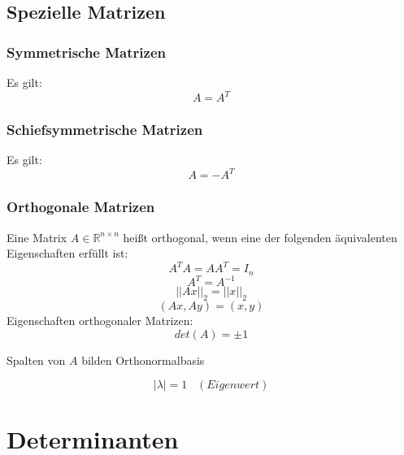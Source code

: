 \documentclass[a4paper,twocolumn,10pt]{article}
\begin{document}
\subsection{Spezielle Matrizen}

\subsubsection{Symmetrische Matrizen}
Es gilt:
\begin{equation*}
A=A^T
\end{equation*}

\subsubsection{Schiefsymmetrische Matrizen}
Es gilt:
\begin{equation*}
A=-A^T
\end{equation*}

\subsubsection{Orthogonale Matrizen}
Eine Matrix $A\in\mathbb{R}^{n\times n}$ heißt orthogonal, wenn eine der folgenden äquivalenten Eigenschaften erfüllt ist:
\begin{equation*}
A^TA=AA^T=I_n
\end{equation*}
\begin{equation*}
A^T=A^{-1}
\end{equation*}
\begin{equation*}
||Ax||_2 = ||x||_2
\end{equation*}
\begin{equation*}
(Ax, Ay)=(x,y)
\end{equation*}
Eigenschaften orthogonaler Matrizen:
\begin{equation*}
det(A)=\pm 1
\end{equation*}
\begin{center}
Spalten von $A$ bilden Orthonormalbasis
\end{center}
\begin{equation*}
|\lambda|=1\;\;\;(Eigenwert)
\end{equation*}

\section{Determinanten}
\end{document}

